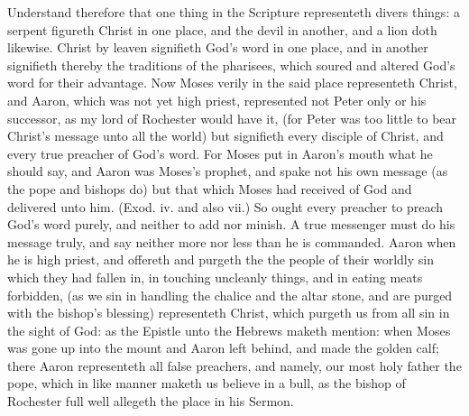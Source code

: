 Understand therefore that one thing in the Scripture representeth
divers things: a serpent figureth Christ in one 
place, and the devil in another, and a lion doth likewise. 
Christ by leaven signifieth God's word in one place, and in 
another signifieth thereby the traditions of the pharisees, 
which soured and altered God's word for their advantage. 
Now Moses verily in the said place representeth Christ, 
and Aaron, which was not yet high priest, represented not
Peter only or his successor, as my lord of Rochester would 
have it, (for Peter was too little to bear Christ's message 
unto all the world) but signifieth every disciple of Christ, and 
every true preacher of God's word. For Moses put in 
Aaron's mouth what he should say, and Aaron was Moses's
prophet, and spake not his own message (as the pope 
and bishops do) but that which Moses had received of God 
and delivered unto him. (Exod. iv. and also vii.) So ought 
every preacher to preach God's word purely, and neither 
to add nor minish. A true messenger must do his message 
truly, and say neither more nor less than he is commanded. 
Aaron when he is high priest, and offereth and purgeth the 
the people of their worldly sin which they had fallen in, in 
touching uncleanly things, and in eating meats forbidden, 
(as we sin in handling the chalice and the altar stone, and 
are purged with the bishop's blessing) representeth Christ, 
which purgeth us from all sin in the sight of God: as the 
Epistle unto the Hebrews maketh mention: when Moses 
was gone up into the mount and Aaron left behind, and 
made the golden calf; there Aaron representeth all false 
preachers, and namely, our most holy father the pope, 
which in like manner maketh us believe in a bull, as the 
bishop of Rochester full well allegeth the place in his 
Sermon. 

